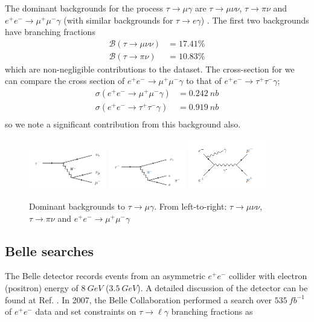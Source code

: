 \documentclass[12pt]{thesis}  %
\newcommand{\br}{\mathcal{B}}
\newcommand{\tmg}{\tau\to\mu\gamma}
\newcommand{\tlg}{\tau\to\ell\gamma}
\begin{document}
The dominant backgrounds for the process $\tmg$ are $\tau\to \mu \nu \nu$, $\tau\to \pi \nu$ and $e^+ e^- \to \mu^+ \mu^- \gamma$ (with similar backgrounds for $\tau\to e \gamma$) \cite{Hayasaka:2007}. The first two backgrounds have branching fractions
\begin{align}
\br(\tau\to \mu \nu \nu)&=17.41\%\\
\br(\tau\to\pi\nu)&=10.83\%
\end{align}
which are non-negligible contributions to the dataset. The cross-section for we can compare the cross section of $e^+ e^- \to \mu^+ \mu^- \gamma$ to that of $e^+ e^- \to \tau^+ \tau^- \gamma$;
\begin{align}
\sigma(e^+ e^- \to \mu^+ \mu^- \gamma)&=\SI{0.242}{nb}\\
\sigma(e^+ e^- \to \tau^+ \tau^- \gamma)&=\SI{0.919}{nb}\\
\end{align}
so we note a significant contribution from this background also.

\begin{figure}[h]
\centering
\includegraphics[width=0.3\textwidth]{images/taumununu.png}
\includegraphics[width=0.3\textwidth]{images/taupinu.png}
\includegraphics[width=0.3\textwidth]{images/eemumugamma.png}
\caption{Dominant backgrounds to $\tmg$. From left-to-right: $\tau\to \mu \nu \nu$, $\tau\to \pi \nu$ and $e^+ e^- \to \mu^+ \mu^- \gamma$}
\end{figure}


\subsection{Belle searches}


The Belle detector records events from an asymmetric $e^+ e^-$ collider with electron (positron) energy of $\SI{8}{GeV}$ ($\SI{3.5}{GeV}$). A detailed discussion of the detector can be found at Ref. \cite{Belle:2002}. In 2007, the Belle Collaboration performed a search over $\SI{535}{fb^{-1}}$ of $e^+ e^-$ data and set constraints \cite{Hayasaka:2007} on $\tlg$ branching fractions as
\end{document}
